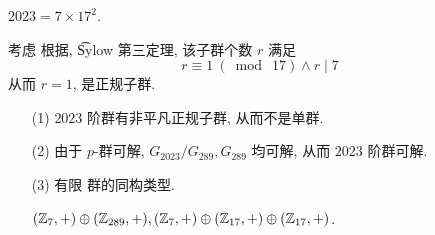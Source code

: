 \problem[题目 6]

\begin{solution}
	$2023=7\times 17^2$.
	
	考虑 \Sy[17] 根据, \t{Sylow} 第三定理, 该子群个数 $r$ 满足 $$r\equiv 1\ (\bmod\ 17)\wedge r\mid 7$$ 从而 $r=1$, \Sy[17] 是正规子群.
	
	\begin{itemize}
		\item[(1)] $2023$ 阶群有非平凡正规子群, 从而不是单群.
		\item[(2)] 由于 $p$-群可解, $G_{2023}/G_{289},G_{289}$ 均可解, 从而 $2023$ 阶群可解.
		\item[(3)] 有限 \Abel 群的同构类型.
		
		$(\mathbb Z_7,+)\oplus(\mathbb Z_{289},+),(\mathbb Z_7,+)\oplus(\mathbb Z_{17},+)\oplus(\mathbb Z_{17},+)$.
	\end{itemize}
\end{solution}

\problem[题目 7]

